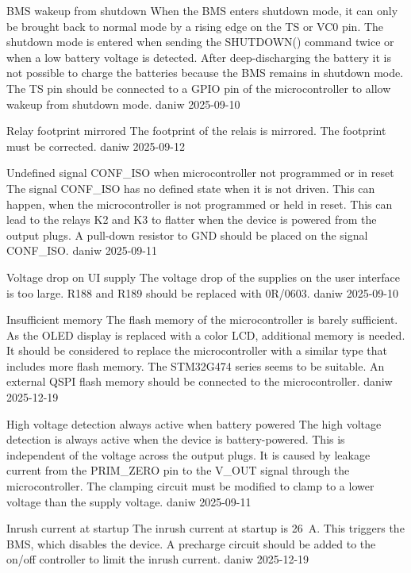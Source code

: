 \begin{ModTable}

\ModItemDone
{BMS wakeup from shutdown}
{When the \ac{BMS} enters shutdown mode, it can only be brought back to normal mode by a rising edge on the TS or VC0 pin. The shutdown mode is entered when sending the SHUTDOWN() command twice or when a low battery voltage is detected. After deep-discharging the battery it is not possible to charge the batteries because the \ac{BMS} remains in shutdown mode. }
{The TS pin should be connected to a GPIO pin of the microcontroller to allow wakeup from shutdown mode. }
{daniw}
{2025-09-10}

\ModItemDone
{Relay footprint mirrored}
{The footprint of the relais is mirrored. }
{The footprint must be corrected. }
{daniw}
{2025-09-12}

\ModItemDone
{Undefined signal CONF\_ISO when microcontroller not programmed or in reset}
{The signal CONF\_ISO has no defined state when it is not driven. This can happen, when the microcontroller is not programmed or held in reset. This can lead to the relays K2 and K3 to flatter when the device is powered from the output plugs. }
{A pull-down resistor to GND should be placed on the signal CONF\_ISO. }
{daniw}
{2025-09-11}

\ModItemDone
{Voltage drop on UI supply}
{The voltage drop of the supplies on the user interface is too large. }
{R188 and R189 should be replaced with 0R/0603. }
{daniw}
{2025-09-10}

\ModItemDone
{Insufficient memory}
{The flash memory of the microcontroller is barely sufficient. As the \ac{OLED} display is replaced with a color LCD, additional memory is needed. }
{It should be considered to replace the microcontroller with a similar type that includes more flash memory. The STM32G474 series seems to be suitable. An external \ac{QSPI} flash memory should be connected to the microcontroller. }
{daniw}
{2025-12-19}

\ModItemDone
{High voltage detection always active when battery powered}
{The high voltage detection is always active when the device is battery-powered. This is independent of the voltage across the output plugs. It is caused by leakage current from the PRIM\_ZERO pin to the V\_OUT signal through the microcontroller. }
{The clamping circuit must be modified to clamp to a lower voltage than the supply voltage. }
{daniw}
{2025-09-11}

\ModItemDone
{Inrush current at startup}
{The inrush current at startup is \qty{26}{\ampere}. This triggers the \ac{BMS}, which disables the device. }
{A precharge circuit should be added to the on/off controller to limit the inrush current. }
{daniw}
{2025-12-19}


\end{ModTable}
